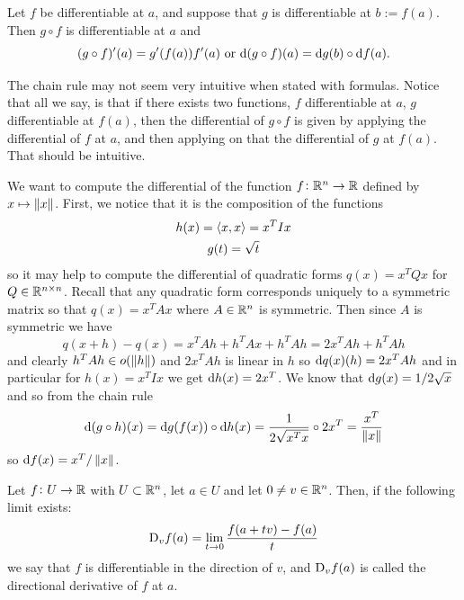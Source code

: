\documentclass[11pt,a4paper]{article}
\begin{document}
\begin{proposition}
  Let $f$ be differentiable at $a$, and suppose that $g$ is differentiable
  at $b := f(a)$. Then $g \circ f$ is differentiable at $a$ and
  \[
    (g \circ f)'(a) = g'(f(a)) f'(a) \text{ or }
    \mathrm{d} (g \circ f)(a) = \mathrm{d} g(b) \circ \mathrm{d} f(a).
  \]
\end{proposition}

\begin{remark}
  The chain rule may not seem very intuitive when stated with formulas.
  Notice that all we say, is that if there exists two functions,
  $f$ differentiable at $a$,  $g$ differentiable at $f(a)$,
  then the differential of $g \circ f$ is given by
  applying the differential of $f$ at $a$,
  and then applying on that the differential of $g$ at $f(a)$.
  That should be intuitive.
\end{remark}

\begin{example}
  \label{exmp:dnorm}
  We want to compute the differential of the function $f \colon \mathbb{R}^n \to \mathbb{R}$
  defined by $x \mapsto \left\lVert x\right\rVert$.
  First, we notice that it is the composition of the functions
  \begin{gather*}
    h(x) = \left\langle x, x \right\rangle = x^T I x \\
    g(t) = \sqrt{t}
  \end{gather*}
  so it may help to compute the differential of
  quadratic forms $q(x) = x^T Q x$ for $Q \in \mathbb{R}^{n \times n}$.
  Recall that any quadratic form corresponds uniquely to a symmetric
  matrix so that $q(x) = x^T A x$ where $A \in \mathbb{R}^{n}$ is symmetric.
  Then since $A$ is symmetric we have
  \[
    q(x + h) - q(x) =
    x^T A h + h^T A x + h^T A h =
    2 x^T A h + h^T A h
  \]
  and clearly $h^T A h \in o(\left\lVert h\right\rVert)$ and $2 x^T A h$ is linear in $h$
  so $\mathrm{d} q(x)(h) = 2 x^T A h$ and in particular
  for $h(x) = x^T I x$ we get $\mathrm{d} h(x) = 2 x^T$.
  We know that $\mathrm{d} g(x) = 1/2\sqrt{x}$ and so from the chain rule
  \[
    \mathrm{d} (g \circ h)(x) = \mathrm{d} g(f(x)) \circ \mathrm{d} h(x) =
    \frac{1}{2\sqrt{x^T x}} \circ 2 x^T =
    \frac{x^T}{\left\lVert x\right\rVert}
  \]
  so $\mathrm{d} f(x) = x^T/\left\lVert x\right\rVert$.
\end{example}

\begin{definition}
  Let $f \colon U \to \mathbb{R}$ with $U \subset \mathbb{R}^n$,
  let $a \in U$ and let $0 \neq v \in \mathbb{R}^n$.
  Then, if the following limit exists:
  \[
    \mathrm{D}_v f(a) = \lim_{t \to 0}{\frac{f(a + tv) - f(a)}{t}}
  \]
  we say that $f$ is differentiable in the direction of $v$, and
  $\mathrm{D}_v f(a)$ is called the directional derivative of $f$ at $a$.
\end{definition}
\end{document}
